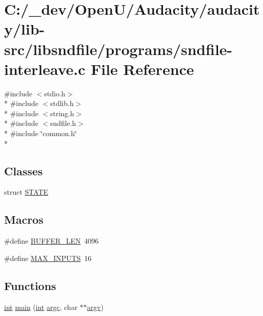 \hypertarget{sndfile-interleave_8c}{}\section{C\+:/\+\_\+dev/\+Open\+U/\+Audacity/audacity/lib-\/src/libsndfile/programs/sndfile-\/interleave.c File Reference}
\label{sndfile-interleave_8c}
{\ttfamily \#include $<$stdio.\+h$>$}\\*
{\ttfamily \#include $<$stdlib.\+h$>$}\\*
{\ttfamily \#include $<$string.\+h$>$}\\*
{\ttfamily \#include $<$sndfile.\+h$>$}\\*
{\ttfamily \#include \char`\"{}common.\+h\char`\"{}}\\*
\subsection*{Classes}
\begin{DoxyCompactItemize}
\item 
struct \hyperlink{struct_s_t_a_t_e}{S\+T\+A\+TE}
\end{DoxyCompactItemize}
\subsection*{Macros}
\begin{DoxyCompactItemize}
\item 
\#define \hyperlink{sndfile-interleave_8c_a46130dc86f2322714bba26960b64e7bb}{B\+U\+F\+F\+E\+R\+\_\+\+L\+EN}~4096
\item 
\#define \hyperlink{sndfile-interleave_8c_a67ea8592b7ced96ca53dec58434397e8}{M\+A\+X\+\_\+\+I\+N\+P\+U\+TS}~16
\end{DoxyCompactItemize}
\subsection*{Functions}
\begin{DoxyCompactItemize}
\item 
\hyperlink{xmltok_8h_a5a0d4a5641ce434f1d23533f2b2e6653}{int} \hyperlink{sndfile-interleave_8c_a3c04138a5bfe5d72780bb7e82a18e627}{main} (\hyperlink{xmltok_8h_a5a0d4a5641ce434f1d23533f2b2e6653}{int} \hyperlink{cmdline_8c_aaffeb1bf2056ea44af5b5d0ee4d6ff07}{argc}, char $\ast$$\ast$\hyperlink{cmdline_8c_ad407d5ba91709bd9b092003858600723}{argv})
\end{DoxyCompactItemize}


